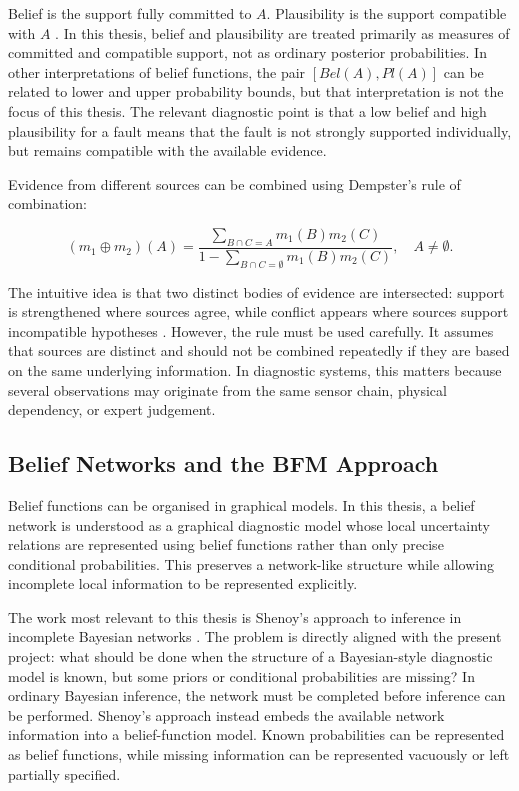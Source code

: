 \documentclass[runningheads]{llncs}
\begin{document}
Belief is the support fully committed to $A$. Plausibility is the support compatible with $A$ \cite{Shafer1976,SmetsKennes1994}. In this thesis, belief and plausibility are treated primarily as measures of committed and compatible support, not as ordinary posterior probabilities. In other interpretations of belief functions, the pair $[Bel(A),Pl(A)]$ can be related to lower and upper probability bounds, but that interpretation is not the focus of this thesis. The relevant diagnostic point is that a low belief and high plausibility for a fault means that the fault is not strongly supported individually, but remains compatible with the available evidence.

Evidence from different sources can be combined using Dempster's rule of combination:

\begin{equation}
(m_1 \oplus m_2)(A) =
\frac{\sum_{B \cap C = A} m_1(B)m_2(C)}
{1 - \sum_{B \cap C = \emptyset} m_1(B)m_2(C)}, \quad A \neq \emptyset.
\label{eq:dempsters_rule}
\end{equation}

The intuitive idea is that two distinct bodies of evidence are intersected: support is strengthened where sources agree, while conflict appears where sources support incompatible hypotheses \cite{Shafer1976,ShaferShenoyMellouli1987}. However, the rule must be used carefully. It assumes that sources are distinct and should not be combined repeatedly if they are based on the same underlying information. In diagnostic systems, this matters because several observations may originate from the same sensor chain, physical dependency, or expert judgement.

\subsection{Belief Networks and the BFM Approach}
\label{sec:belief_networks_bfm_approach}

Belief functions can be organised in graphical models. In this thesis, a belief network is understood as a graphical diagnostic model whose local uncertainty relations are represented using belief functions rather than only precise conditional probabilities. This preserves a network-like structure while allowing incomplete local information to be represented explicitly.

The work most relevant to this thesis is Shenoy's approach to inference in incomplete Bayesian networks \cite{Shenoy2023IncompleteBN}. The problem is directly aligned with the present project: what should be done when the structure of a Bayesian-style diagnostic model is known, but some priors or conditional probabilities are missing? In ordinary Bayesian inference, the network must be completed before inference can be performed. Shenoy's approach instead embeds the available network information into a belief-function model. Known probabilities can be represented as belief functions, while missing information can be represented vacuously or left partially specified.
\end{document}
